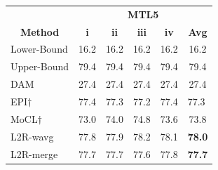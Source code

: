 \documentclass[11pt]{article}
\begin{document}
\begin{table}[]
\centering
\begin{tabular}{lccccc}
\hline
                                    & \multicolumn{5}{c}{\textbf{MTL5}}                                                                                                    \\
\multicolumn{1}{c}{\textbf{Method}} & \textbf{i}               & \textbf{ii}               & \textbf{iii}               & \textbf{iv}               & \textbf{Avg}             \\
\hline
Lower-Bound                         & 16.2                     & 16.2                     & 16.2                     & 16.2                     & 16.2                     \\
Upper-Bound                         & 79.4                     & 79.4                     & 79.4                     & 79.4                     & 79.4                     \\
\hline
DAM                                 & 27.4                     & 27.4                     & 27.4                     & 27.4                     & 27.4                     \\
EPI$\dagger$                                 & \multicolumn{1}{l}{77.4} & \multicolumn{1}{l}{77.3} & \multicolumn{1}{l}{77.2} & \multicolumn{1}{l}{77.4} & \multicolumn{1}{l}{77.3} \\
MoCL$\dagger$                                & 73.0                     & 74.0                     & 74.8                     & 73.6                     & 73.8                     \\
L2R-wavg                            & 77.8                     & 77.9                     & 78.2                     & 78.1                     & \textbf{78.0}                     \\
L2R-merge                          & 77.7                     & 77.7                     & 77.6                     & 77.8                     & \textbf{77.7}                    \\
\hline
\end{tabular}

\end{table}
\end{document}
